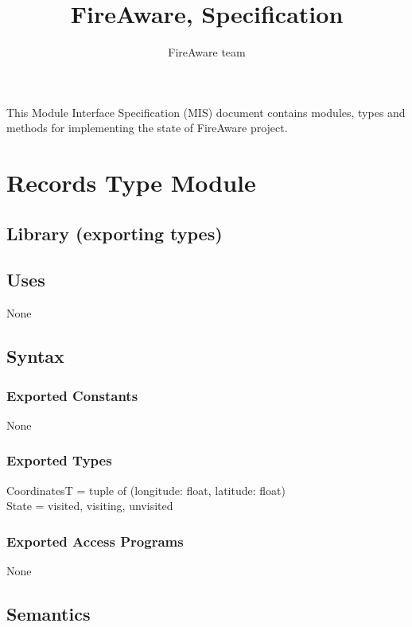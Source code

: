 \documentclass[12pt]{article}
\title{FireAware, Specification}
\author{FireAware team}
\begin{document}
\maketitle
This Module Interface Specification (MIS) document contains modules, types and
methods for implementing the state of FireAware project.

\newpage

\section* {Records Type Module}

\subsection*{Library (exporting types)}


\subsection* {Uses}

None

\subsection* {Syntax}

\subsubsection* {Exported Constants}

None

\subsubsection* {Exported Types}

CoordinatesT = tuple of (longitude: float, latitude: float)\\ 
State = {visited, visiting, unvisited}\\

\subsubsection* {Exported Access Programs}

None

\subsection* {Semantics}
\end{document}
